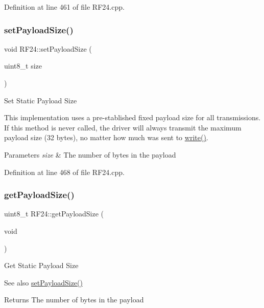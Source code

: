 Definition at line 461 of file R\+F24.\+cpp.

\mbox{\label{classRF24_a343e5d23477181011dea030fafb1954f}} 
\subsubsection{\texorpdfstring{set\+Payload\+Size()}{setPayloadSize()}}
{\footnotesize\ttfamily void R\+F24\+::set\+Payload\+Size (\begin{DoxyParamCaption}\item[{uint8\+\_\+t}]{size }\end{DoxyParamCaption})}

Set Static Payload Size

This implementation uses a pre-\/stablished fixed payload size for all transmissions. If this method is never called, the driver will always transmit the maximum payload size (32 bytes), no matter how much was sent to \hyperlink{classRF24_a4cd4c198a47704db20b6b5cf0731cd58}{write()}.


\begin{DoxyParams}{Parameters}
{\em size} & The number of bytes in the payload \\
\hline
\end{DoxyParams}


Definition at line 468 of file R\+F24.\+cpp.

\mbox{\label{classRF24_a0aa0c7cbe3d38fef4722f3f1d2d6c5f1}} 
\subsubsection{\texorpdfstring{get\+Payload\+Size()}{getPayloadSize()}}
{\footnotesize\ttfamily uint8\+\_\+t R\+F24\+::get\+Payload\+Size (\begin{DoxyParamCaption}\item[{void}]{ }\end{DoxyParamCaption})}

Get Static Payload Size

\begin{DoxySeeAlso}{See also}
\hyperlink{classRF24_a343e5d23477181011dea030fafb1954f}{set\+Payload\+Size()}
\end{DoxySeeAlso}
\begin{DoxyReturn}{Returns}
The number of bytes in the payload 
\end{DoxyReturn}


